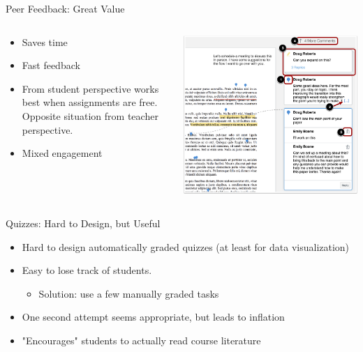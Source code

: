 \begin{frame}{Peer Feedback: Great Value}
  \begin{columns}[c,onlytextwidth]
    \begin{column}{0.6\linewidth}
      \begin{itemize}
        \item Saves time
        \item Fast feedback
        \item From student perspective works best when assignments are free.
              Opposite situation from teacher perspective.
        \item Mixed engagement
      \end{itemize}
    \end{column}
    \begin{column}{0.4\linewidth}
      \includegraphics[width=\linewidth]{figures/peer-reviews.png}
    \end{column}
  \end{columns}
\end{frame}

\begin{frame}{Quizzes: Hard to Design, but Useful}
  \begin{itemize}
    \item Hard to design automatically graded quizzes (at least for data
          visualization)
    \item Easy to lose track of students.
          \begin{itemize}
            \item Solution: use a few manually graded tasks
          \end{itemize}
    \item One second attempt seems appropriate, but leads to inflation
    \item "Encourages" students to actually read course literature
  \end{itemize}
\end{frame}


